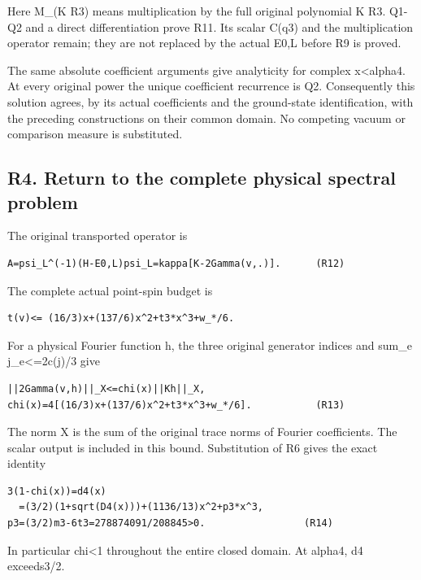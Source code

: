 \documentclass[11pt,a4paper]{article}
\renewcommand{\[}{\begingroup\small\originaldisplaystart}
\renewcommand{\]}{\originaldisplayend\endgroup}
\begin{document}
Here M\_(K R3) means multiplication by the full original polynomial K
R3. Q1-Q2 and a direct differentiation prove R11. Its scalar C(q3) and
the multiplication operator remain; they are not replaced by the actual
E0,L before R9 is proved.

The same absolute coefficient arguments give analyticity for complex
\textbar x\textbar\textless alpha4. At every original power the unique
coefficient recurrence is Q2. Consequently this solution agrees, by its
actual coefficients and the ground-state identification, with the
preceding constructions on their common domain. No competing vacuum or
comparison measure is substituted.

\subsection{R4. Return to the complete physical spectral
problem}\label{r4.-return-to-the-complete-physical-spectral-problem}

The original transported operator is

\begin{verbatim}
A=psi_L^(-1)(H-E0,L)psi_L=kappa[K-2Gamma(v,.)].      (R12)
\end{verbatim}

The complete actual point-spin budget is

\begin{verbatim}
t(v)<= (16/3)x+(137/6)x^2+t3*x^3+w_*/6.
\end{verbatim}

For a physical Fourier function h, the three original generator indices
and sum\_e j\_e\textless=2c(j)/3 give

\begin{verbatim}
||2Gamma(v,h)||_X<=chi(x)||Kh||_X,
chi(x)=4[(16/3)x+(137/6)x^2+t3*x^3+w_*/6].           (R13)
\end{verbatim}

The norm X is the sum of the original trace norms of Fourier
coefficients. The scalar output is included in this bound. Substitution
of R6 gives the exact identity

\begin{verbatim}
3(1-chi(x))=d4(x)
  =(3/2)(1+sqrt(D4(x)))+(1136/13)x^2+p3*x^3,
p3=(3/2)m3-6t3=278874091/208845>0.                 (R14)
\end{verbatim}

In particular chi\textless1 throughout the entire closed domain. At
alpha4, d4 exceeds3/2.
\end{document}

